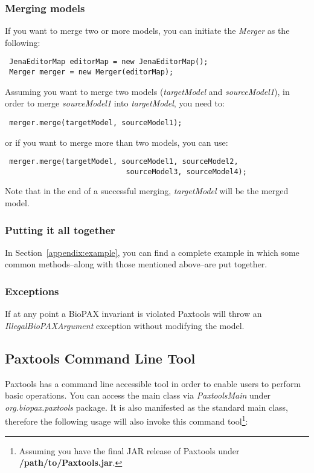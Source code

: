 \documentclass[10pt]{article}
\newenvironment{mylisting}
{\begin{list}{}{\setlength{\leftmargin}{2em}}\item\small\bfseries}
{\end{list}}
\begin{document}
\subsubsection{Merging models}
If you want to merge two or more models, you can initiate the \textit{Merger} as the following:
\begin{mylisting}
\begin{verbatim}
 JenaEditorMap editorMap = new JenaEditorMap();
 Merger merger = new Merger(editorMap);
\end{verbatim}
\end{mylisting}

Assuming you want to merge two models (\textit{targetModel} and \textit{sourceModel1}), in order to merge \textit{sourceModel1} into \textit{targetModel}, you need to:

\begin{mylisting}
\begin{verbatim}
 merger.merge(targetModel, sourceModel1);
\end{verbatim}
\end{mylisting}

or if you want to merge more than two models, you can use:

\begin{mylisting}
\begin{verbatim}
 merger.merge(targetModel, sourceModel1, sourceModel2, 
                            sourceModel3, sourceModel4);
\end{verbatim}
\end{mylisting}

Note that in the end of a successful merging, \textit{targetModel} will be the merged model.

\subsubsection{Putting it all together}
In Section~\ref{appendix:example}, you can find a complete example in which some common methods--along with those mentioned above--are put together.

\subsubsection{Exceptions}
If at any point a BioPAX invariant is violated Paxtools will throw an \textit{IllegalBioPAXArgument} exception without modifying the model.

\subsection{Paxtools Command Line Tool}
Paxtools has a command line accessible tool in order to enable users to perform basic operations. You can access the main class via \emph{PaxtoolsMain} under \emph{org.biopax.paxtools} package. It is also manifested as the standard main class, therefore the following usage will also invoke this command tool\footnote{Assuming you have the final JAR release of Paxtools under \textbf{/path/to/Paxtools.jar}.}:
\end{document}
